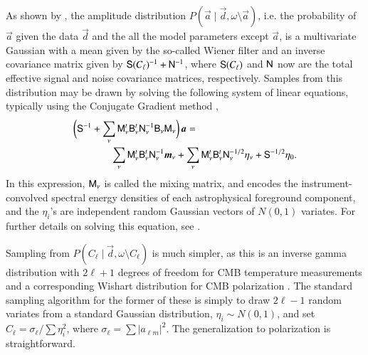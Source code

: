 \documentclass[onecolumn]{aa}
\renewcommand{\d}[0]{\vec{d}}
\renewcommand{\a}[0]{\vec{a}}
\newcommand{\m}[0]{\vec{m}}
\newcommand{\B}[0]{\tens{B}}
\newcommand{\N}[0]{\tens{N}}
\newcommand{\M}[0]{\tens{M}}
\renewcommand{\S}[0]{\tens{S}}
\begin{document}
As shown by \citet{jewell2004,wandelt2004}, the amplitude distribution
$P(\a\mid\d,\omega\setminus\a)$, i.e. the probability of $\a$ given the data $\d$ 
and the all the model parameters except $\a$, is a multivariate Gaussian with a
mean given by the so-called Wiener filter and an inverse covariance
matrix given by $\S(C_{\ell})^{-1}+\N^{-1}$, where $\S(C_{\ell})$ and $\N$ now are the
total effective signal and noise covariance matrices, respectively. Samples from this distribution may be
drawn by solving the following system of linear equations, typically
using the Conjugate Gradient method \citep{shewchuk:1994},
\begin{equation}
  \label{eq:wiener}
  \begin{split}
    \biggl(\S^{-1} + \sum_{\nu}\M^t_{\nu}\B^t_{\nu}&\N_{\nu}^{-1}\B_{\nu}\M_{\nu}\biggr)\,\a = \\
    \sum_\nu\M_\nu^t&\B_{\nu}^t\N_\nu^{-1}\m_{\nu} 
    + \sum_{\nu}\M_{\nu}^t\B_{\nu}^t\N_{\nu}^{-1/2}\eta_{\nu} +
    \S^{-1/2}\eta_{0}.
  \end{split}
\end{equation}
In this expression, $\M_{\nu}$ is called the mixing matrix, and
encodes the instrument-convolved spectral energy densities of each
astrophysical foreground component, and the $\eta_i$'s are independent
random Gaussian vectors of $N(0,1)$ variates. For further details on
solving this equation, see \citet{eriksen2008,seljebotn:2019,bp01,bp11}.

Sampling from $P(C_{\ell}\mid\d,\omega\setminus C_{\ell})$ is much
simpler, as this is an inverse gamma distribution with $2\ell+1$
degrees of freedom for CMB temperature measurements
\citep{wandelt2004} and a corresponding Wishart distribution for CMB
polarization \citep{larson:2006}. The standard sampling algorithm for
the former of these is simply to draw $2\ell-1$ random variates from a
standard Gaussian distribution, $\eta_i\sim N(0,1)$, and set $C_{\ell}
= \sigma_{\ell} / \sum \eta_i^2$, where $\sigma_\ell = \sum |a_{\ell
  m}|^2$. The generalization to polarization is straightforward.
\end{document}
